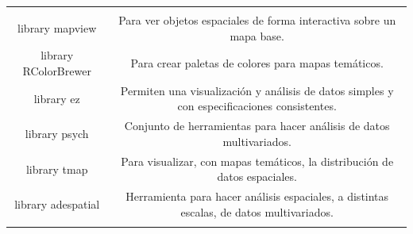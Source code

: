 \documentclass[11pt,]{article}
\begin{document}
\begin{longtable}[]{@{}cc@{}}
\begin{minipage}[t]{0.80\columnwidth}
\end{minipage}\tabularnewline
\begin{minipage}[t]{0.14\columnwidth}\centering\strut
library mapview\strut
\end{minipage} & \begin{minipage}[t]{0.80\columnwidth}\centering\strut
Para ver objetos espaciales de forma interactiva sobre un mapa
base.\strut
\end{minipage}\tabularnewline
\begin{minipage}[t]{0.14\columnwidth}\centering\strut
library RColorBrewer\strut
\end{minipage} & \begin{minipage}[t]{0.80\columnwidth}\centering\strut
Para crear paletas de colores para mapas temáticos.\strut
\end{minipage}\tabularnewline
\begin{minipage}[t]{0.14\columnwidth}\centering\strut
library ez\strut
\end{minipage} & \begin{minipage}[t]{0.80\columnwidth}\centering\strut
Permiten una visualización y análisis de datos simples y con
especificaciones consistentes.\strut
\end{minipage}\tabularnewline
\begin{minipage}[t]{0.14\columnwidth}\centering\strut
library psych\strut
\end{minipage} & \begin{minipage}[t]{0.80\columnwidth}\centering\strut
Conjunto de herramientas para hacer análisis de datos
multivariados.\strut
\end{minipage}\tabularnewline
\begin{minipage}[t]{0.14\columnwidth}\centering\strut
library tmap\strut
\end{minipage} & \begin{minipage}[t]{0.80\columnwidth}\centering\strut
Para visualizar, con mapas temáticos, la distribución de datos
espaciales.\strut
\end{minipage}\tabularnewline
\begin{minipage}[t]{0.14\columnwidth}\centering\strut
library adespatial\strut
\end{minipage} & \begin{minipage}[t]{0.80\columnwidth}\centering\strut
Herramienta para hacer análisis espaciales, a distintas escalas, de
datos multivariados.\strut
\end{minipage}\tabularnewline
\begin{minipage}[t]{0.14\columnwidth}\centering\strut

\end{minipage}
\end{longtable}
\end{document}
